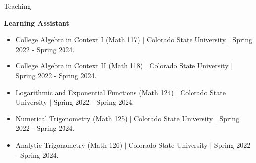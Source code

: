 \documentclass[
	11pt, %
]{resume} %
\begin{document}
	



	


\begin{rSection}{Teaching}


	\textbf{Learning Assistant}
	\begin{itemize}
		\item{College Algebra in Context I (Math 117) $\mid$ Colorado State University $\mid$ Spring 2022 - Spring 2024.}
		\item{College Algebra in Context II (Math 118) $\mid$ Colorado State University $\mid$ Spring 2022 - Spring 2024.}
		\item{Logarithmic and Exponential Functions (Math 124) $\mid$ Colorado State University $\mid$ Spring 2022 - Spring 2024.}
		\item{Numerical Trigonometry (Math 125) $\mid$ Colorado State University $\mid$ Spring 2022 - Spring 2024.}
		\item{Analytic Trigonometry (Math 126) $\mid$ Colorado State University $\mid$ Spring 2022 - Spring 2024.}
	\end{itemize}
	
\end{rSection}
\end{document}
